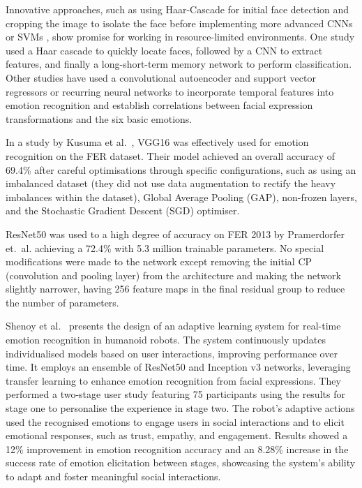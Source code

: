 Innovative approaches, such as using Haar-Cascade for initial face detection and cropping the image to isolate the face before implementing more advanced CNNs \cite{Appuhamy2018-dc} or SVMs \cite{Gupta2018-af} \cite{Rosula_Reyes2020-yz}, show promise for working in resource-limited environments. One study used a Haar cascade to quickly locate faces, followed by a CNN to extract features, and finally a long-short-term memory network \cite{8760246} to perform classification. Other studies have used a convolutional autoencoder and support vector regressors \cite{Allognon2020-um} or recurring neural networks \cite{Brandizzi2021AutomaticRI} to incorporate temporal features into emotion recognition and establish correlations between facial expression transformations and the six basic emotions.

In a study by Kusuma et al.\ \cite{Kusuma2020-oa}, VGG16 was effectively used for emotion recognition on the FER dataset. Their model achieved an overall accuracy of 69.4\% after careful optimisations through specific configurations, such as using an imbalanced dataset (they did not use data augmentation to rectify the heavy imbalances within the dataset), Global Average Pooling (GAP), non-frozen layers, and the Stochastic Gradient Descent (SGD) optimiser.

ResNet50 was used to a high degree of accuracy on FER 2013 by Pramerdorfer et.\ al. \cite{Pramerdorfer2016-xx} achieving a 72.4\% with 5.3 million trainable parameters. No special modifications were made to the network except removing the initial CP (convolution and pooling layer) from the architecture and making the network slightly narrower, having 256 feature maps in the final residual group to reduce the number of parameters.

Shenoy et al.\ \cite{9900581} presents the design of an adaptive learning system for real-time emotion recognition in humanoid robots. The system continuously updates individualised models based on user interactions, improving performance over time. It employs an ensemble of ResNet50 and Inception v3 networks, leveraging transfer learning to enhance emotion recognition from facial expressions. They performed a two-stage user study featuring 75 participants using the results for stage one to personalise the experience in stage two. The robot's adaptive actions used the recognised emotions to engage users in social interactions and to elicit emotional responses, such as trust, empathy, and engagement. Results showed a 12\% improvement in emotion recognition accuracy and an 8.28\% increase in the success rate of emotion elicitation between stages, showcasing the system's ability to adapt and foster meaningful social interactions.

